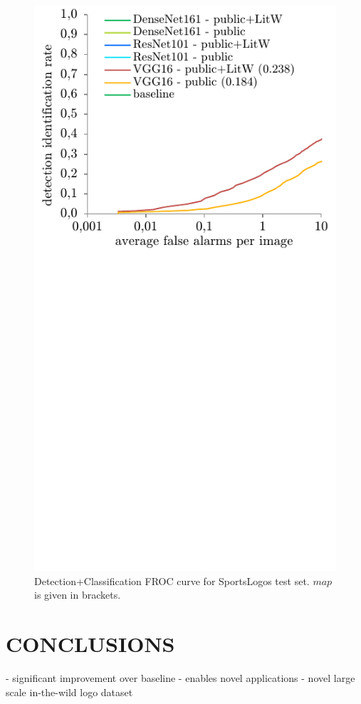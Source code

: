 \documentclass[a4paper,twoside]{article}
\newcommand{\map}{$\mathit{map}$}
\begin{document}
%
\begin{figure}%
\centering%
\includegraphics[width=\linewidth, trim=0cm 7cm 0cm 0cm, clip]{img/classificationFrocFootball.pdf}%
\caption{Detection+Classification FROC curve for SportsLogos test set. \map is given in brackets.}%
\label{fig:classificationFrocFootball}
\end{figure}%
%

\section{\uppercase{Conclusions}}
\label{sec:conclusion}
\noindent- significant improvement over baseline
- enables novel applications
- novel large scale in-the-wild logo dataset



\vfill

{\small
}

\vfill
\end{document}
